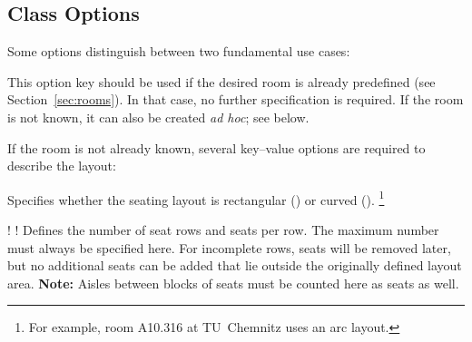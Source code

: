 \documentclass[
babel-options={english},
load-preamble-,
title=compact
]{cnltx-doc}
\begin{document}
\subsection{Class Options}
\label{sec:class-options}
Some options distinguish between two fundamental use cases:
\begin{options}
   This option key should be used if the desired room
  is already predefined (see Section~\ref{sec:rooms}).
  In that case, no further specification is required.
  If the room is not known, it can also be created \emph{ad hoc}; see below.
\end{options}
If the room is not already known, several key–value options are required to describe the layout:


\begin{options}
  Specifies whether the seating layout is rectangular () or curved ().%
  \footnote{For example, room A10.316 at TU~Chemnitz uses an arc layout.}

  \Default*!{}\vspace{-.3\baselineskip}
  \Default!{}
  Defines the number of seat rows and seats per row. The maximum number must always be specified here.
  For incomplete rows, seats will be removed later, but no additional seats can be added that lie outside
  the originally defined layout area.
  \textbf{Note:} Aisles between blocks of seats must be counted here as seats as well.
\end{options}

\end{document}
